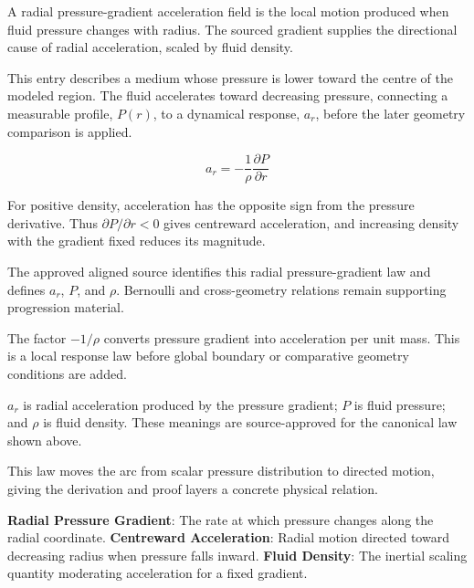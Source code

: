 
A radial pressure-gradient acceleration field is the local motion produced when fluid pressure changes with radius. The sourced gradient supplies the directional cause of radial acceleration, scaled by fluid density.


This entry describes a medium whose pressure is lower toward the centre of the modeled region. The fluid accelerates toward decreasing pressure, connecting a measurable profile, \(P(r)\), to a dynamical response, \(a_r\), before the later geometry comparison is applied.


\[
a_r=-\frac{1}{\rho}\frac{\partial P}{\partial r}
\]


For positive density, acceleration has the opposite sign from the pressure derivative. Thus \(\partial P/\partial r<0\) gives centreward acceleration, and increasing density with the gradient fixed reduces its magnitude.


The approved aligned source identifies this radial pressure-gradient law and defines \(a_r\), \(P\), and \(\rho\). Bernoulli and cross-geometry relations remain supporting progression material.


The factor \(-1/\rho\) converts pressure gradient into acceleration per unit mass. This is a local response law before global boundary or comparative geometry conditions are added.


\(a_r\) is radial acceleration produced by the pressure gradient; \(P\) is fluid pressure; and \(\rho\) is fluid density. These meanings are source-approved for the canonical law shown above.


This law moves the arc from scalar pressure distribution to directed motion, giving the derivation and proof layers a concrete physical relation.


\noindent \textbf{Radial Pressure Gradient}: The rate at which pressure changes along the radial coordinate. \enspace\textbullet\enspace \textbf{Centreward Acceleration}: Radial motion directed toward decreasing radius when pressure falls inward. \enspace\textbullet\enspace \textbf{Fluid Density}: The inertial scaling quantity moderating acceleration for a fixed gradient.\par

